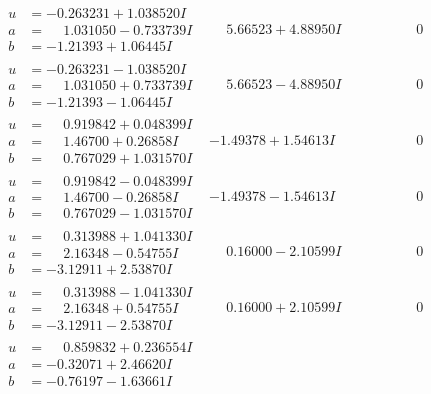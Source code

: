 \documentclass[1p]{elsarticle_modified}
\theoremstyle{definition}
\begin{document}
$$\begin{array}{c|c|c}
\begin{aligned}
u &= -0.263231 + 1.038520 I \\
a &= \phantom{-}1.031050 - 0.733739 I \\
b &= -1.21393 + 1.06445 I\end{aligned}
 & \phantom{-}5.66523 + 4.88950 I & \phantom{-0.000000 } 0 \\ \hline\begin{aligned}
u &= -0.263231 - 1.038520 I \\
a &= \phantom{-}1.031050 + 0.733739 I \\
b &= -1.21393 - 1.06445 I\end{aligned}
 & \phantom{-}5.66523 - 4.88950 I & \phantom{-0.000000 } 0 \\ \hline\begin{aligned}
u &= \phantom{-}0.919842 + 0.048399 I \\
a &= \phantom{-}1.46700 + 0.26858 I \\
b &= \phantom{-}0.767029 + 1.031570 I\end{aligned}
 & -1.49378 + 1.54613 I & \phantom{-0.000000 } 0 \\ \hline\begin{aligned}
u &= \phantom{-}0.919842 - 0.048399 I \\
a &= \phantom{-}1.46700 - 0.26858 I \\
b &= \phantom{-}0.767029 - 1.031570 I\end{aligned}
 & -1.49378 - 1.54613 I & \phantom{-0.000000 } 0 \\ \hline\begin{aligned}
u &= \phantom{-}0.313988 + 1.041330 I \\
a &= \phantom{-}2.16348 - 0.54755 I \\
b &= -3.12911 + 2.53870 I\end{aligned}
 & \phantom{-}0.16000 - 2.10599 I & \phantom{-0.000000 } 0 \\ \hline\begin{aligned}
u &= \phantom{-}0.313988 - 1.041330 I \\
a &= \phantom{-}2.16348 + 0.54755 I \\
b &= -3.12911 - 2.53870 I\end{aligned}
 & \phantom{-}0.16000 + 2.10599 I & \phantom{-0.000000 } 0 \\ \hline\begin{aligned}
u &= \phantom{-}0.859832 + 0.236554 I \\
a &= -0.32071 + 2.46620 I \\
b &= -0.76197 - 1.63661 I\end{aligned}

\end{array}$$
\end{document}
